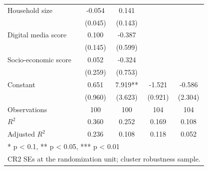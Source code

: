 \begin{table}
\begin{tabular}[t]{lcccc}
Household size & -0.054 & 0.141 &  & \\
 & (0.045) & (0.143) &  & \\
Digital media score & 0.100 & -0.387 &  & \\
 & (0.145) & (0.599) &  & \\
Socio-economic score & 0.052 & -0.324 &  & \\
 & (0.259) & (0.753) &  & \\
Constant & 0.651 & 7.919** & -1.521 & -0.586\\
 & (0.960) & (3.623) & (0.921) & (2.304)\\
Observations & 100 & 100 & 104 & 104\\
$R^{2}$ & 0.360 & 0.252 & 0.169 & 0.108\\
Adjusted $R^{2}$ & 0.236 & 0.108 & 0.118 & 0.052\\
\bottomrule
\multicolumn{5}{l}{\rule{0pt}{1em}* p < 0.1, ** p < 0.05, *** p < 0.01}\\
\multicolumn{5}{l}{\rule{0pt}{1em}CR2 SEs at the randomization unit; cluster robustness sample.}\\
\end{tabular}
\end{table}
